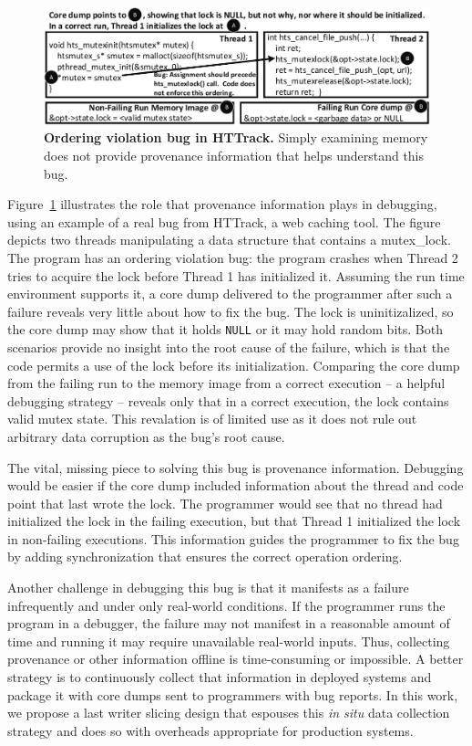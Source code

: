 \documentclass[preprint,9pt]{sigplanconf}
\begin{document}
\begin{figure}[h]
\centering
\includegraphics[width=\columnwidth]{figs/BackgroundCoreDumpFail.pdf}
\caption{\label{fig:coreDumpFail}{\bf Ordering violation bug in HTTrack.} Simply examining memory does not provide provenance information that helps understand this bug.}
\end{figure}

Figure~\ref{fig:coreDumpFail} illustrates the role that provenance information
plays in debugging, using an example of a real bug from HTTrack, a web caching
tool.  The figure depicts two threads manipulating a data structure that
contains a mutex\_lock.  The program has an ordering violation bug: the
program crashes when Thread 2 tries to acquire the lock before Thread 1 has
initialized it.  Assuming the run time environment supports it, a core dump
delivered to the programmer after such a failure reveals very little about how
to fix the bug.  The lock is uninitizalized, so the core dump may show that it
holds {\tt NULL} or it may hold random bits.  Both scenarios provide no
insight into the root cause of the failure, which is that the code permits a
use of the lock before its initialization.   Comparing the core dump from the
failing run to the memory image from a correct execution -- a helpful debugging
strategy -- reveals only that in a correct execution, the lock contains valid
mutex state.  This revalation is of limited use as it does not rule out
arbitrary data corruption as the bug's root cause.

The vital, missing piece to solving this bug is provenance information.
Debugging would be easier if the core dump included information about the
thread and code point that last wrote the lock.  The programmer would see that
no thread had initialized the lock in the failing execution, but that Thread 1
initialized the lock in non-failing executions.  This information guides the
programmer to fix the bug by adding synchronization that ensures the correct
operation ordering.

Another challenge in debugging this bug is that it manifests as a failure
infrequently and under only real-world conditions.  If the programmer runs the
program in a debugger, the failure may not manifest in a reasonable amount of
time and running it may require unavailable real-world inputs.  Thus,
collecting provenance or other information offline is time-consuming or
impossible.  A better strategy is to continuously collect that information in
deployed systems and package it with core dumps sent to programmers with bug
reports.  In this work, we propose a last writer slicing design that espouses
this {\em in situ} data collection strategy and does so with overheads
appropriate for production systems.
\end{document}
